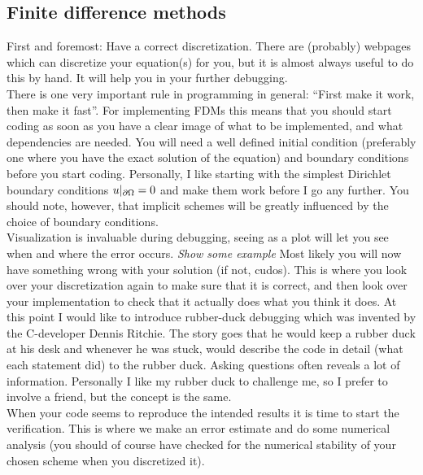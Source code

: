 \subsection{Finite difference methods}
First and foremost: Have a correct discretization. There are (probably) webpages which can discretize your equation(s) for you, but it is almost always useful to do this by hand. 
It will help you in your further debugging. \\
There is one very important rule in programming in general: ``First make it work, then make it fast''. 
For implementing FDMs this means that you should start coding as soon as you have a clear image of what to be implemented, and what dependencies are needed. You will need a well defined initial condition (preferably one where you have the exact solution of the equation) and boundary conditions before you start coding. 
Personally, I like starting with the simplest Dirichlet boundary conditions $u|_{\partial \Omega} = 0$ and make them work before I go any further. 
You should note, however, that implicit schemes will be greatly influenced by the choice of boundary conditions.\\
Visualization is invaluable during debugging, seeing as a plot will let you see when and where the error occurs. \emph{Show some example}
Most likely you will now have something wrong with your solution (if not, cudos). This is where you look over your discretization again to make sure that it is correct, and then look over your implementation to check that it actually does what you think it does. 
At this point I would like to introduce rubber-duck debugging which was invented by the C-developer Dennis Ritchie. The story goes that he would keep a rubber duck at his desk and whenever he was stuck, would describe the code in detail (what each statement did) to the rubber duck. Asking questions often reveals a lot of information. Personally I like my rubber duck to challenge me, so I prefer to involve a friend, but the concept is the same.\\
When your code seems to reproduce the intended results it is time to start the verification. This is where we make an error estimate and do some numerical analysis (you should of course have checked for the numerical stability of your chosen scheme when you discretized it).
